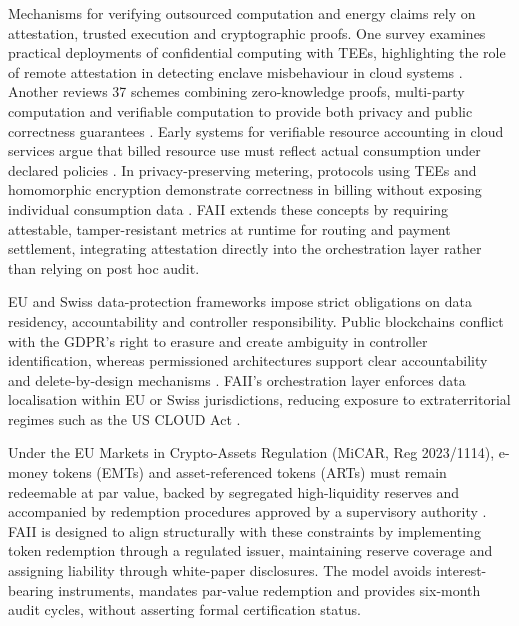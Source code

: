 \documentclass[oneside,10pt]{swissi}
\begin{document}
Mechanisms for verifying outsourced computation and energy claims rely on attestation, trusted execution and cryptographic proofs. One survey examines practical deployments of confidential computing with TEEs, highlighting the role of remote attestation in detecting enclave misbehaviour in cloud systems \cite{Chen2023}. Another reviews 37 schemes combining zero-knowledge proofs, multi-party computation and verifiable computation to provide both privacy and public correctness guarantees \cite{Bontekoe2023}. Early systems for verifiable resource accounting in cloud services argue that billed resource use must reflect actual consumption under declared policies \cite{VerifiableAccounting2010}. In privacy-preserving metering, protocols using TEEs and homomorphic encryption demonstrate correctness in billing without exposing individual consumption data \cite{Rial2016}. FAII extends these concepts by requiring attestable, tamper-resistant metrics at runtime for routing and payment settlement, integrating attestation directly into the orchestration layer rather than relying on post hoc audit.

EU and Swiss data-protection frameworks impose strict obligations on data residency, accountability and controller responsibility. Public blockchains conflict with the GDPR’s right to erasure and create ambiguity in controller identification, whereas permissioned architectures support clear accountability and delete-by-design mechanisms \cite{BelenSaglam2022,Haque2021}. FAII’s orchestration layer enforces data localisation within EU or Swiss jurisdictions, reducing exposure to extraterritorial regimes such as the US CLOUD Act \cite{Wire2025,Haque2021}.

Under the EU Markets in Crypto-Assets Regulation (MiCAR, Reg 2023/1114), e-money tokens (EMTs) and asset-referenced tokens (ARTs) must remain redeemable at par value, backed by segregated high-liquidity reserves and accompanied by redemption procedures approved by a supervisory authority \cite{EBA2024,Ey2023}. FAII is designed to align structurally with these constraints by implementing token redemption through a regulated issuer, maintaining reserve coverage and assigning liability through white-paper disclosures. The model avoids interest-bearing instruments, mandates par-value redemption and provides six-month audit cycles, without asserting formal certification status.
\end{document}
